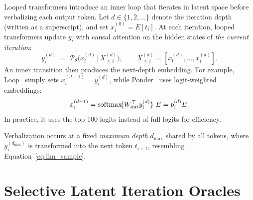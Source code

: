 Looped transformers introduce an inner loop that iterates in latent space before verbalizing each output token. 
Let $d\in\{1,2,\dots\}$ denote the iteration depth (written as a superscript), and set $x_i^{(0)}=E[t_i]$. 
At each iteration, looped transformers update $y_i$ with causal attention on the hidden states of \emph{the current iteration}:
\begin{equation}
    y_i^{(d)} \;=\; \mathcal{P}_{\theta}\!\big(x_i^{(d)} \,\big|\, X_{\le i}^{(d)}\big),
    \qquad
    X_{\le i}^{(d)}=[x_0^{(d)},\dots,x_i^{(d)}].
    \label{eq:rllm_decode}
\end{equation}
An inner transition then produces the next-depth embedding. 
For example, Loop~\citep{saunshi2025loopedTrans} simply sets $x_i^{(d+1)}=y_i^{(d)}$, while Ponder~\citep{zeng2025pondering} uses logit-weighted embeddings:
\begin{equation}
    x_i^{(d+1)}=\mathrm{softmax}\!\big(W_{\text{out}}^\top y_i^{(d)}\big)\ E = p_i^{(d)} E.
    \label{eq:ours_update}
\end{equation}
In practice, it uses the top-100 logits instead of full logits for efficiency.

Verbalization occurs at a fixed \emph{maximum depth} $d_{\max}$ shared by all tokens, where $y_i^{(d_{\max})}$ is transformed into the next token $t_{i+1}$, resembling Equation~\ref{eq:llm_sample}.

\section{Selective Latent Iteration Oracles}
\label{sec:oracle}

